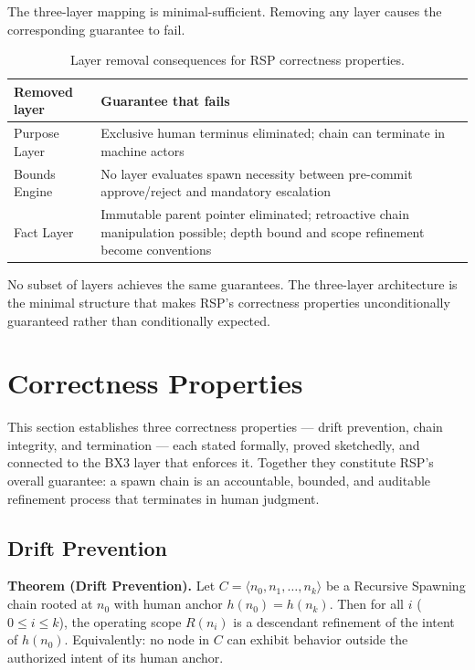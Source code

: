 The three-layer mapping is minimal-sufficient. Removing any layer causes the corresponding guarantee to fail.

\begin{table}[h]
\centering
\begin{tabular}{p{3.0cm} p{5.2cm}}
\toprule
\textbf{Removed layer} & \textbf{Guarantee that fails} \\
\midrule
Purpose Layer        & Exclusive human terminus eliminated; chain can terminate in machine actors \\
Bounds Engine        & No layer evaluates spawn necessity between pre-commit approve/reject and mandatory escalation \\
Fact Layer           & Immutable parent pointer eliminated; retroactive chain manipulation possible; depth bound and scope refinement become conventions \\
\bottomrule
\end{tabular}
\caption{Layer removal consequences for RSP correctness properties.}
\label{tab:layer-minimality}
\end{table}

No subset of layers achieves the same guarantees. The three-layer architecture is the minimal structure that makes RSP's correctness properties unconditionally guaranteed rather than conditionally expected.

\section{Correctness Properties}
\label{sec:rs-correctness}

This section establishes three correctness properties — drift prevention, chain integrity, and termination — each stated formally, proved sketchedly, and connected to the BX3 layer that enforces it. Together they constitute RSP's overall guarantee: a spawn chain is an accountable, bounded, and auditable refinement process that terminates in human judgment.

\subsection{Drift Prevention}
\label{sec:rs-drift-prevention}

\medskip
\noindent\textbf{Theorem (Drift Prevention).} Let $C = \langle n_0, n_1, \ldots, n_k \rangle$ be a Recursive Spawning chain rooted at $n_0$ with human anchor $h(n_0) = h(n_k)$. Then for all $i$ ($0 \leq i \leq k$), the operating scope $R(n_i)$ is a descendant refinement of the intent of $h(n_0)$. Equivalently: no node in $C$ can exhibit behavior outside the authorized intent of its human anchor.

